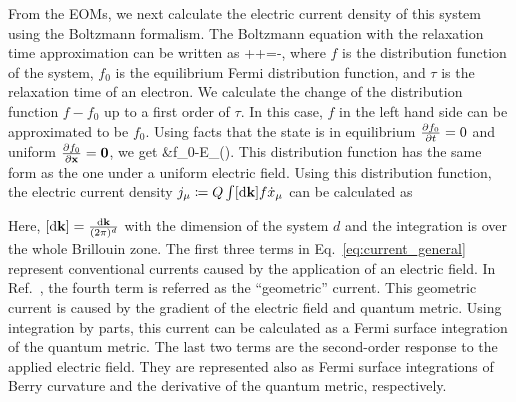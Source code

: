 \documentclass[aps,prb,longbibliography,superscriptaddress,twocolumn]{revtex4-2}
\def\be#1\ee{\begin{align}#1\end{align}}
\begin{document}
From the EOMs, we next calculate the electric current density of this system using the Boltzmann formalism. The Boltzmann equation with the relaxation time approximation can be written as
\be
    \pdv{f}{t}+\cdot{}+\cdot{}=-,
\ee
where $f$ is the distribution function of the system, $f_0$ is the equilibrium Fermi distribution function, and $\tau$ is the relaxation time of an electron. We calculate the change of the distribution function $f-f_0$ up to a first order of $\tau$. In this case, $f$ in the left hand side can be approximated to be $f_0$. Using facts that the state is in equilibrium $\pdv{f_0}{t}=0$ and uniform $\pdv{f_0}{\vb{x}}=\vb{0}$, we get
\be
    f&\approx f_0-E_{\mu}().
\ee
This distribution function has the same form as the one under a uniform electric field. Using this distribution function, the electric current density $j_{\mu}\coloneqq Q\int[\mathrm{d}\vb{k}]f\dot{x}_{\mu}$ can be calculated as
Here, $\qty[\mathrm{d}\vb{k}] = \frac{\mathrm{d}\vb{k}}{(2\pi)^d}$ with the dimension of the system $d$ and the integration is over the whole Brillouin zone. The first three terms in Eq.~\eqref{eq:current_general} represent conventional currents caused by the application of an electric field. In Ref.~\cite{Lapa_Hughes_2019}, the fourth term is referred as the ``geometric'' current. This geometric current is caused by the gradient of the electric field and quantum metric. Using integration by parts, this current can be calculated as a Fermi surface integration of the quantum metric. The last two terms are the second-order response to the applied electric field. They are represented also as Fermi surface integrations of Berry curvature and the derivative of the quantum metric, respectively.
\end{document}
